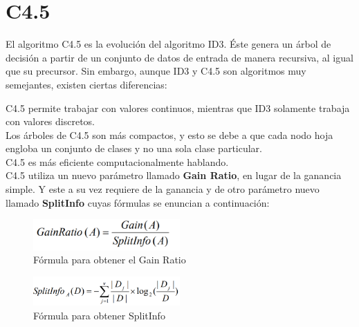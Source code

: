\section{C4.5} \label{c4.5}
El algoritmo C4.5 es la evolución del algoritmo ID3. Éste genera un árbol de decisión a partir de un conjunto de datos de entrada de manera recursiva, al igual que su precursor\cite{c4.5}. Sin embargo, aunque ID3 y C4.5 son algoritmos muy semejantes, existen ciertas diferencias:\\

\begin{UClist}
	\UCli C4.5 permite trabajar con valores continuos, mientras que ID3 solamente trabaja con valores discretos.\\
	\UCli Los árboles de C4.5 son más compactos, y esto se debe a que cada nodo hoja engloba un conjunto de clases y no una sola clase particular.\\
	\UCli C4.5 es más eficiente computacionalmente hablando.\\
	\UCli C4.5 utiliza un nuevo parámetro llamado \textbf{Gain Ratio}, en lugar de la ganancia simple. Y este a su vez requiere de la ganancia y de otro parámetro nuevo llamado \textbf{SplitInfo} cuyas fórmulas se enuncian a continuación\cite{c4.5}:
	
	\begin{figure}[H]
		\hypertarget{fig:formula-gainratio}{\hspace{1pt}}
		\begin{center}
			\includegraphics[width=0.5\textwidth]{capitulo2/images/formula-gainratio.png}
			\caption{Fórmula para obtener el Gain Ratio}
			\label{fig:formula-gainratio}
		\end{center}
	\end{figure}

	\begin{figure}[H]
		\hypertarget{fig:formula-splitinfo}{\hspace{1pt}}
		\begin{center}
			\includegraphics[width=0.5\textwidth]{capitulo2/images/formula-splitinfo.png}
			\caption{Fórmula para obtener SplitInfo}
			\label{fig:formula-splitinfo}
		\end{center}
	\end{figure}

\end{UClist}

